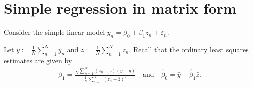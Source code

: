 \documentclass[
  letterpaper,
  DIV=11,
  numbers=noendperiod]{scrartcl}
\begin{document}
\newcommand{\bv}{\mybold{\beta}}
\newcommand{\bvhat}{\hat{\bv}}
\newcommand{\bhat}{\hat{\beta}}
\newcommand{\betahat}{\hat{\beta}}

\newcommand{\alphav}{\mybold{\alpha}}
\newcommand{\alphavhat}{\hat{\av}}
\newcommand{\alphahat}{\hat{\alpha}}

\newcommand{\gv}{\mybold{\gamma}}
\newcommand{\gvhat}{\hat{\gv}}
\newcommand{\ghat}{\hat{\gamma}}

\newcommand{\hv}{\mybold{\h}}
\newcommand{\hvhat}{\hat{\hv}}
\newcommand{\hhat}{\hat{\h}}

\newcommand{\gammav}{\mybold{\gamma}}
\newcommand{\gammavhat}{\hat{\gammav}}
\newcommand{\gammahat}{\hat{\gamma}}

\newcommand{\new}{\mathrm{new}}
\newcommand{\zerov}{\mybold{0}}
\newcommand{\onev}{\mybold{1}}
\newcommand{\id}{\mybold{I}}

\newcommand{\sigmahat}{\hat{\sigma}}

\newcommand{\etav}{\mybold{\eta}}
\newcommand{\muv}{\mybold{\mu}}
\newcommand{\Sigmam}{\mybold{\Sigma}}

\newcommand{\rdom}[1]{\mathbb{R}^{#1}}

\newcommand{\RV}[1]{\tilde{#1}}

\def\A{\mybold{A}}

\def\A{\mybold{A}}
\def\av{\mybold{a}}
\def\a{a}

\def\A{\mybold{A}}

\def\S{\mybold{S}}
\def\sv{\mybold{s}}
\def\s{s}

\def\R{\mybold{R}}
\def\rv{\mybold{r}}
\def\r{r}

\def\V{\mybold{V}}
\def\vv{\mybold{v}}
\def\v{v}

\def\U{\mybold{U}}
\def\uv{\mybold{u}}
\def\u{u}

\def\Sc{\mathcal{S}}
\def\ev{\mybold{e}}

\def\Lammat{\mybold{\Lambda}}

\hypertarget{simple-regression-in-matrix-form}{%
\section{Simple regression in matrix
form}\label{simple-regression-in-matrix-form}}

Consider the simple linear model
\(y_n = \beta_0 + \beta_1 z_n + \varepsilon_n\).

Let \(\bar{y}:= \frac{1}{N} \sum_{n=1}^Ny_n\) and
\(\bar{z}:= \frac{1}{N} \sum_{n=1}^Nz_n\). Recall that the ordinary
least squares estimates are given by \[
\begin{aligned}
    \hat{\beta}_1 = \frac{\frac{1}{N} \sum_{n=1}^N(z_n - \bar{z}) (y- \bar{y})}{\frac{1}{N} \sum_{n=1}^N(z_n - \bar{z})^2}
    \quad\textrm{and}\quad
    \hat{\beta}_0 = \bar{y}- \hat{\beta}_1 \bar{z}.
\end{aligned}
\]
\end{document}
